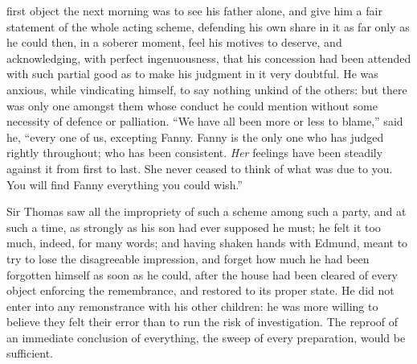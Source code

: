  first object the next morning was to see his
father alone, and give him a fair statement of the whole
acting scheme, defending his own share in it as far only
as he could then, in a soberer moment, feel his motives
to deserve, and acknowledging, with perfect ingenuousness,
that his concession had been attended with such partial
good as to make his judgment in it very doubtful.
He was anxious, while vindicating himself, to say nothing
unkind of the others:  but there was only one amongst them
whose conduct he could mention without some necessity
of defence or palliation.  ``We have all been more or less
to blame,'' said he, ``every one of us, excepting Fanny.
Fanny is the only one who has judged rightly throughout;
who has been consistent.  \emph{Her} feelings have been steadily
against it from first to last.  She never ceased to think
of what was due to you.  You will find Fanny everything you
could wish.''

Sir Thomas saw all the impropriety of such a scheme among
such a party, and at such a time, as strongly as his son
had ever supposed he must; he felt it too much, indeed,
for many words; and having shaken hands with Edmund,
meant to try to lose the disagreeable impression,
and forget how much he had been forgotten himself as soon
as he could, after the house had been cleared of every
object enforcing the remembrance, and restored to its
proper state.  He did not enter into any remonstrance with
his other children:  he was more willing to believe they
felt their error than to run the risk of investigation.
The reproof of an immediate conclusion of everything,
the sweep of every preparation, would be sufficient.

